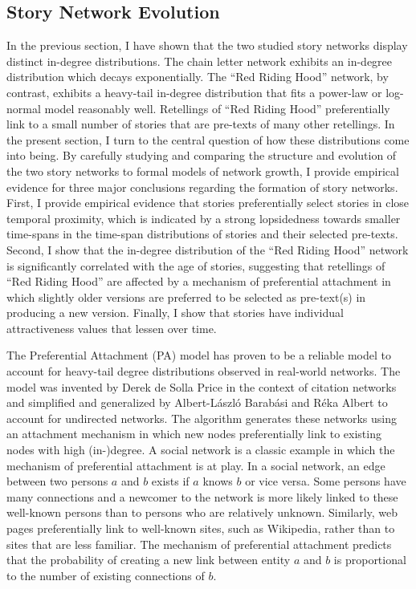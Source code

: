 \subsection{Story Network Evolution}\label{sec:network-evolution}

In the previous section, I have shown that the two studied story networks display distinct in-degree distributions. The chain letter network exhibits an in-degree distribution which decays exponentially. The ``Red Riding Hood'' network, by contrast, exhibits a heavy-tail in-degree distribution that fits a power-law or log-normal model reasonably well. Retellings of ``Red Riding Hood'' preferentially link to a small number of stories that are pre-texts of many other retellings. In the present section, I turn to the central question of how these distributions come into being. By carefully studying and comparing the structure and evolution of the two story networks to formal models of network growth, I provide empirical evidence for three major conclusions regarding the formation of story networks. First, I provide empirical evidence that stories preferentially select stories in close temporal proximity, which is indicated by a strong lopsidedness towards smaller time-spans in the time-span distributions of stories and their selected pre-texts. Second, I show that the in-degree distribution of the ``Red Riding Hood'' network is significantly correlated with the age of stories, suggesting that retellings of ``Red Riding Hood'' are affected by a mechanism of preferential attachment in which slightly older versions are preferred to be selected as pre-text(s) in producing a new version. Finally, I show that stories have individual attractiveness values that lessen over time.

The Preferential Attachment (PA) model has proven to be a reliable model to account for heavy-tail degree distributions observed in real-world networks. The model was invented by Derek de Solla Price in the context of citation networks\autocite{price:1976} and simplified and generalized by Albert-László Barabási and Réka Albert to account for undirected networks\autocite{barabasi:1999}. The algorithm generates these networks using an attachment mechanism in which new nodes preferentially link to existing nodes with high (in-)degree. A social network is a classic example in which the mechanism of preferential attachment is at play. In a social network, an edge between two persons $a$ and $b$ exists if $a$ knows $b$ or vice versa. Some persons have many connections and a newcomer to the network is more likely linked to these well-known persons than to persons who are relatively unknown. Similarly, web pages preferentially link to well-known sites, such as Wikipedia, rather than to sites that are less familiar. The mechanism of preferential attachment predicts that the probability of creating a new link between entity $a$ and $b$ is proportional to the number of existing connections of $b$. 


